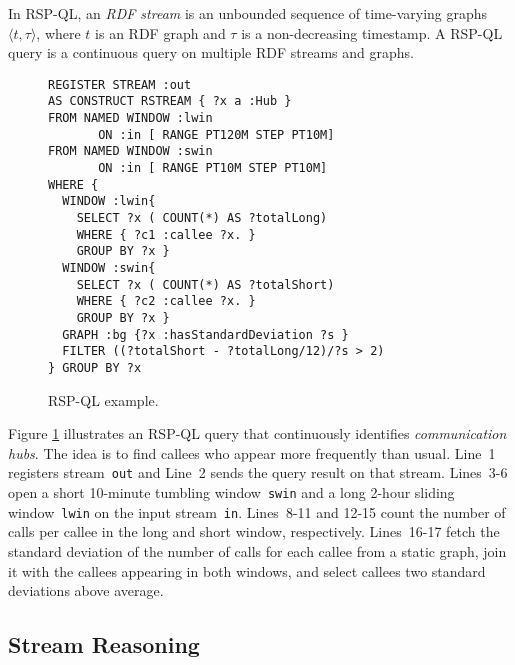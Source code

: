 In RSP-QL, an \textit{RDF stream} is an unbounded sequence of
time-varying graphs $\langle t,\tau\rangle$, where $t$ is an RDF graph
and $\tau$ is a non-decreasing timestamp.  A RSP-QL query is a
continuous query on multiple RDF streams and graphs.  

\begin{figure}[!h]
\begin{lstlisting}[language=rsp-ql]
REGISTER STREAM :out
AS CONSTRUCT RSTREAM { ?x a :Hub }
FROM NAMED WINDOW :lwin
       ON :in [ RANGE PT120M STEP PT10M]
FROM NAMED WINDOW :swin
       ON :in [ RANGE PT10M STEP PT10M]
WHERE {
  WINDOW :lwin{
    SELECT ?x ( COUNT(*) AS ?totalLong)
    WHERE { ?c1 :callee ?x. }
    GROUP BY ?x }
  WINDOW :swin{
    SELECT ?x ( COUNT(*) AS ?totalShort)
    WHERE { ?c2 :callee ?x. }
    GROUP BY ?x }
  GRAPH :bg {?x :hasStandardDeviation ?s }
  FILTER ((?totalShort - ?totalLong/12)/?s > 2)
} GROUP BY ?x
\end{lstlisting}
\vspace*{-4mm}
\caption{\label{fig:rspql}RSP-QL example.}
\end{figure}

Figure \ref{fig:rspql} illustrates an RSP-QL query that continuously
identifies \textit{communication hubs}. The idea is to find callees
who appear more frequently than usual. Line~1 registers stream~\lstinline{out} and Line~2 sends
the query result on that stream. \mbox{Lines 3-6} open a short
10-minute tumbling window~\lstinline{swin} and a long \mbox{2-hour}
sliding window~\lstinline{lwin} on the input
stream~\lstinline{in}. \mbox{Lines 8-11} and \mbox{12-15} count the
number of calls per callee in the long and short window,
respectively. \mbox{Lines 16-17} fetch the standard deviation of the
number of calls for each callee from a static graph, join it with the
callees appearing in both windows, and select callees two
standard deviations above average.

\subsection{Stream Reasoning}\label{sec:sr} %

